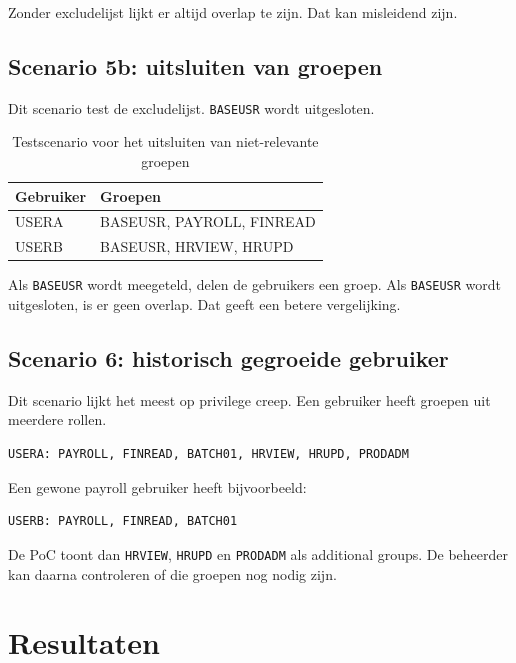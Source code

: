Zonder excludelijst lijkt er altijd overlap te zijn. Dat kan misleidend zijn.

\subsection*{Scenario 5b: uitsluiten van groepen}

Dit scenario test de excludelijst. \texttt{BASEUSR} wordt uitgesloten.

\begin{table}[htbp]
\centering
\caption[Scenario 5b: uitsluiten van groepen]{Testscenario voor het uitsluiten van niet-relevante groepen}
\label{tab:scenario-uitsluiten-groepen}
\begin{tabular}{|p{3cm}|p{8cm}|}
\hline
\textbf{Gebruiker} & \textbf{Groepen} \\
\hline
USERA & BASEUSR, PAYROLL, FINREAD \\
\hline
USERB & BASEUSR, HRVIEW, HRUPD \\
\hline
\end{tabular}
\end{table}

Als \texttt{BASEUSR} wordt meegeteld, delen de gebruikers een groep. Als \texttt{BASEUSR} wordt uitgesloten, is er geen overlap. Dat geeft een betere vergelijking.

\subsection*{Scenario 6: historisch gegroeide gebruiker}

Dit scenario lijkt het meest op privilege creep. Een gebruiker heeft groepen uit meerdere rollen.

\begin{verbatim}
USERA: PAYROLL, FINREAD, BATCH01, HRVIEW, HRUPD, PRODADM
\end{verbatim}

Een gewone payroll gebruiker heeft bijvoorbeeld:

\begin{verbatim}
USERB: PAYROLL, FINREAD, BATCH01
\end{verbatim}

De PoC toont dan \texttt{HRVIEW}, \texttt{HRUPD} en \texttt{PRODADM} als additional groups. De beheerder kan daarna controleren of die groepen nog nodig zijn.

\section{Resultaten}

